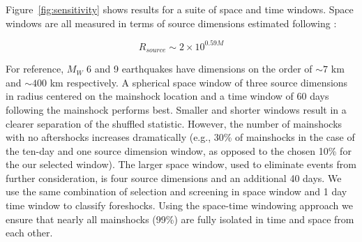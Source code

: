 \documentclass[draft]{agujournal2018}
\begin{document}
Figure~\ref{fig:sensitivity} shows results for a suite of space and time windows. Space windows are all measured in terms of source dimensions estimated following \citet{Wells1994}:
\begin{linenomath*}
\begin{equation}\label{eq:wells}
    R_{source}\sim 2\times 10^{0.59M}
\end{equation}
\end{linenomath*}
For reference, $M_W$ 6 and 9 earthquakes have dimensions on the order of $\sim 7$ km and $\sim 400$ km respectively. A spherical space window of three source dimensions in radius centered on the mainshock location and a time window of 60 days following the mainshock performs best. Smaller and shorter windows result in a clearer separation of the shuffled statistic. However, the number of mainshocks with no aftershocks increases dramatically (e.g., 30\% of mainshocks in the case of the ten-day and one source dimension window, as opposed to the chosen 10\% for the our selected window). The larger space window, used to eliminate events from further consideration, is four source dimensions and an additional 40 days. We use the same combination of selection and screening in space window and 1 day time window to classify foreshocks. Using the space-time windowing approach we ensure that nearly all mainshocks (99\%) are fully isolated in time and space from each other.
\end{document}
